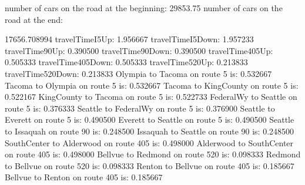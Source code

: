 number of cars on the road at the beginning:
29853.75
number of cars on the road at the end:

17656.708994
travelTimeI5Up: 1.956667
travelTimeI5Down: 1.957233
travelTime90Up: 0.390500
travelTime90Down: 0.390500
travelTime405Up: 0.505333
travelTime405Down: 0.505333
travelTime520Up: 0.213833
travelTime520Down: 0.213833
Olympia to Tacoma on route 5 is: 0.532667
Tacoma to Olympia on route 5 is: 0.532667
Tacoma to KingCounty on route 5 is: 0.522167
KingCounty to Tacoma on route 5 is: 0.522733
FederalWy to Seattle on route 5 is: 0.376333
Seattle to FederalWy on route 5 is: 0.376900
Seattle to Everett on route 5 is: 0.490500
Everett to Seattle on route 5 is: 0.490500
Seattle to Issaquah on route 90 is: 0.248500
Issaquah to Seattle on route 90 is: 0.248500
SouthCenter to Alderwood on route 405 is: 0.498000
Alderwood to SouthCenter on route 405 is: 0.498000
Bellvue to Redmond on route 520 is: 0.098333
Redmond to Bellvue on route 520 is: 0.098333
Renton to Bellvue on route 405 is: 0.185667
Bellvue to Renton on route 405 is: 0.185667